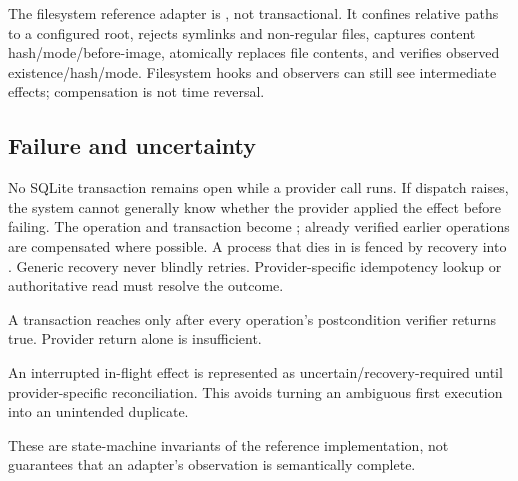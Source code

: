 The filesystem reference adapter is , not transactional. It confines relative paths to a configured root, rejects symlinks and non-regular files, captures content hash/mode/before-image, atomically replaces file contents, and verifies observed existence/hash/mode. Filesystem hooks and observers can still see intermediate effects; compensation is not time reversal.

\subsection{Failure and uncertainty}

No SQLite transaction remains open while a provider call runs. If dispatch raises, the system cannot generally know whether the provider applied the effect before failing. The operation and transaction become ; already verified earlier operations are compensated where possible. A process that dies in  is fenced by recovery into . Generic recovery never blindly retries. Provider-specific idempotency lookup or authoritative read must resolve the outcome.

 A transaction reaches  only after every operation's postcondition verifier returns true. Provider return alone is insufficient.

 An interrupted in-flight effect is represented as uncertain/recovery-required until provider-specific reconciliation. This avoids turning an ambiguous first execution into an unintended duplicate.

These are state-machine invariants of the reference implementation, not guarantees that an adapter's observation is semantically complete.
